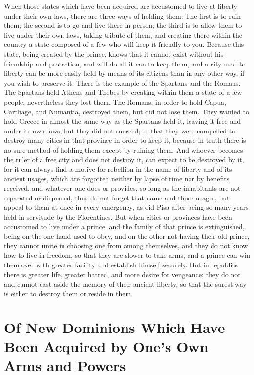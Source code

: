 \documentclass[12pt,letterpaper]{memoir}
\begin{document}
When those states which have been acquired are accustomed to live at
liberty under their own laws, there are three ways of holding them. The
first is to ruin them; the second is to go and live there in person;
the third is to allow them to live under their own laws, taking tribute
of them, and creating there within the country a state composed of a
few who will keep it friendly to you. Because this state, being created
by the prince, knows that it cannot exist without his friendship and
protection, and will do all it can to keep them, and a city used to
liberty can be more easily held by means of its citizens than in
any other way, if you wish to preserve it. There is the example of
the Spartans and the Romans. The Spartans held Athens and Thebes by
creating within them a state of a few people; nevertheless they lost
them. The Romans, in order to hold Capua, Carthage, and Numantia,
destroyed them, but did not lose them. They wanted to hold Greece in
almost the same way as the Spartans held it, leaving it free and under
its own laws, but they did not succeed; so that they were compelled
to destroy many cities in that province in order to keep it, because
in truth there is no sure method of holding them except by ruining
them. And whoever becomes the ruler of a free city and does not destroy
it, can expect to be destroyed by it, for it can always find a motive
for rebellion in the name of liberty and of its ancient usages, which
are forgotten neither by lapse of time nor by benefits received, and
whatever one does or provides, so long as the inhabitants are not
separated or dispersed, they do not forget that name and those usages,
but appeal to them at once in every emergency, as did Pisa after being
so many years held in servitude by the Florentines. But when cities or
provinces have been accustomed to live under a prince, and the family
of that prince is extinguished, being on the one hand used to obey, and
on the other not having their old prince, they cannot unite in choosing
one from among themselves, and they do not know how to live in freedom,
so that they are slower to take arms, and a prince can win them over
with greater facility and establish himself securely. But in republics
there is greater life, greater hatred, and more desire for vengeance;
they do not and cannot cast aside the memory of their ancient liberty,
so that the surest way is either to destroy them or reside in them.

\chapter{Of New Dominions Which Have Been Acquired by One's Own Arms and Powers}
\end{document}

